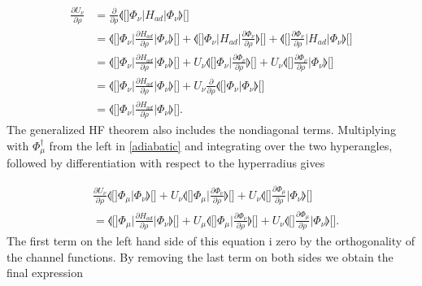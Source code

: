 \begin{align}
\frac{\partial U_{\nu}}{\partial \rho}&=\frac{\partial}{\partial \rho}\llangle[\big]  \Phi_{\nu} \big\lvert H_{ad} \big\rvert  \Phi_{\nu} \rrangle[\big]\nonumber\\
&=\llangle[\Big]  \Phi_{\nu}  \Big\lvert \frac{\partial H_{ad}}{\partial \rho} \Big\rvert  \Phi_{\nu} \rrangle[\Big] +  \llangle[\Big]  \Phi_{\nu} \Big\lvert H_{ad}\Big\rvert  \frac{\partial \Phi_{\nu}}{\partial \rho}  \rrangle[\Big] +\llangle[\Big] \frac{\partial \Phi_{\nu}}{\partial \rho}    \Big\lvert H_{ad}\Big\rvert  \Phi_{\nu}  \rrangle[\Big] \nonumber \\
&=\llangle[\Big]  \Phi_{\nu} \Big\lvert \frac{\partial H_{ad}}{\partial \rho} \Big\rvert  \Phi_{\nu} \rrangle[\Big] + U_{\nu}\llangle[\Big]  \Phi_{\nu} \Big\rvert \frac{\partial \Phi_{\nu}}{\partial \rho}  \rrangle[\Big]+U_{\nu}\llangle[\Big] \frac{\partial \Phi_{\nu}}{\partial \rho}\Big\rvert  \Phi_{\nu} \rrangle[\Big] \nonumber \\
&=\llangle[\Big]  \Phi_{\nu} \Big\lvert \frac{\partial H_{ad}}{\partial \rho} \Big\rvert  \Phi_{\nu} \rrangle[\Big] + U_{\nu} \frac{\partial}{\partial \rho}\llangle[\Big]  \Phi_{\nu} \Big\rvert \Phi_{\nu} \rrangle[\Big] \nonumber \\
&=\llangle[\Big]  \Phi_{\nu}\Big\lvert \frac{\partial H_{ad}}{\partial \rho} \Big\rvert  \Phi_{\nu} \rrangle[\Big].
\end{align}
The generalized HF theorem also includes the nondiagonal terms. Multiplying with $\Phi_{\mu}^{\dagger}$ from the left in \eqref{adiabatic} and integrating over the two hyperangles, followed by differentiation with respect to the hyperradius gives

\begin{align}
&\frac{\partial U_{\nu}}{\partial \rho}\llangle[\Big]  \Phi_{\mu} \Big\lvert \Phi_{\nu} \rrangle[\Big] + U_{\nu}\llangle[\Big]  \Phi_{\mu} \Big\lvert \frac{\partial \Phi_{\nu}}{\partial \rho} \rrangle[\Big]+U_{\nu}\llangle[\Big] \frac{\partial \Phi_{\mu}}{\partial \rho} \Big\lvert \Phi_{\nu} \rrangle[\Big] \nonumber \\
&= \llangle[\Big]  \Phi_{\mu}\Big\lvert \frac{\partial H_{ad}}{\partial \rho} \Big\rvert  \Phi_{\nu} \rrangle[\Big] + U_{\mu}\llangle[\Big]  \Phi_{\mu} \Big\rvert  \frac{\partial \Phi_{\nu}}{\partial \rho}  \rrangle[\Big]+U_{\nu}\llangle[\Big] \frac{\partial \Phi_{\mu}}{\partial \rho}\Big\rvert  \Phi_{\nu} \rrangle[\Big]. 
\end{align}
The first term on the left hand side of this equation i zero by the orthogonality of the channel functions. By removing the last term on both sides we obtain the final expression

